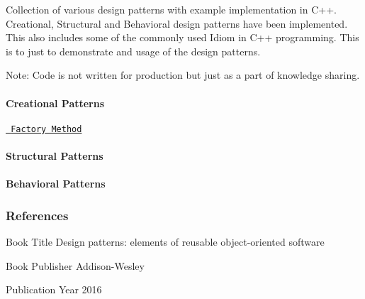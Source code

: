 Collection of various design patterns with example implementation in C++. Creational, Structural and Behavioral design patterns have been implemented. This also includes some of the commonly used Idiom in C++ programming. This is to just to demonstrate and usage of the design patterns.

Note\+: Code is not written for production but just as a part of knowledge sharing.

\paragraph*{Creational Patterns}


\begin{DoxyItemize}
\item \href{https://github.com/jayavardhanravi/DesignPatterns/tree/master/FactoryMethod}{\texttt{ Factory Method}}
\end{DoxyItemize}

\paragraph*{Structural Patterns}


\begin{DoxyItemize}
\item \paragraph*{Behavioral Patterns}
\end{DoxyItemize}


\begin{DoxyItemize}
\item \subsubsection*{References}
\end{DoxyItemize}


\begin{DoxyItemize}
\item Book Title Design patterns\+: elements of reusable object-\/oriented software
\item Book Publisher Addison-\/\+Wesley
\item Publication Year 2016 
\end{DoxyItemize}
